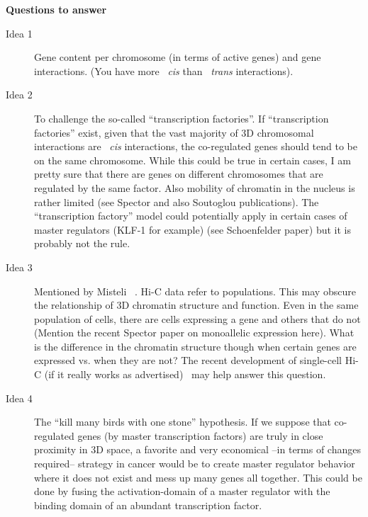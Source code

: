 \documentclass[a4paper,12pt]{article}
\begin{document}
\newpage

\textbf{Questions to answer}\\

\begin{description}
	\item [Idea 1] Gene content per chromosome (in terms of active genes) and gene interactions. (You have more ~\emph{cis} than ~\emph{trans} interactions).
	\item [Idea 2] To challenge the so-called ``transcription factories''. If ``transcription
	factories'' exist, given that the vast majority of 3D chromosomal interactions are ~\emph{cis} interactions, the co-regulated genes should tend to be on the same chromosome. While this could be true in certain cases, I am pretty sure
	that there are genes on different chromosomes that are regulated by the same factor. Also mobility of chromatin in the nucleus is rather limited (see Spector and also Soutoglou publications). The ``transcription factory'' model could potentially apply in certain cases of master regulators (KLF-1 for example) (see
	Schoenfelder paper) but it is probably not the rule. 
	\item [Idea 3] Mentioned by Misteli ~\cite{Misteli:2012ea}. Hi-C data refer to populations. This may obscure the relationship of 3D chromatin structure and function. Even in the same population of cells, there are cells expressing a gene
	and others that do not (Mention the recent Spector paper on monoallelic expression here). What is the difference in the chromatin structure though when certain genes are expressed vs. when they are not? The recent development of single-cell Hi-C (if it really works as advertised)~\cite{Nagano:2013gja} may help answer this question. 
	\item [Idea 4] The ``kill many birds with one stone'' hypothesis. If we suppose that co-regulated genes (by master transcription factors) are truly in close proximity in 3D space, a favorite and very economical --in terms of changes required-- strategy in cancer would be to create master regulator behavior where it does not exist and mess up many genes all together. This could be done by fusing the activation-domain of a master regulator with the binding domain of an abundant transcription factor.
\end{description}



\end{document}
